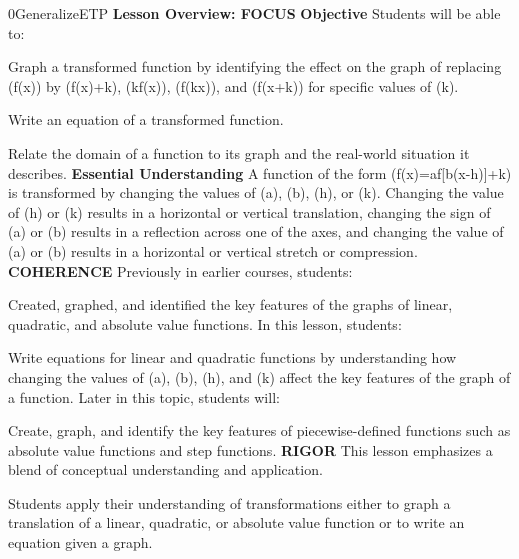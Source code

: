 \documentclass{article}
\newenvironment{te-addendum}[2]{}{}     %
\begin{document}
\begin{te-addendum}{0}{GeneralizeETP}
\textbf{Lesson Overview: FOCUS}
\textbf{Objective} Students will be able to:
\item Graph a transformed function by identifying the effect on the graph of replacing (f(x)) by (f(x)+k), (kf(x)), (f(kx)), and (f(x+k)) for specific values of (k).
\item Write an equation of a transformed function.
\item Relate the domain of a function to its graph and the real-world situation it describes.
\textbf{Essential Understanding}
A function of the form (f(x)=a\cdot f[b(x-h)]+k) is transformed by changing the values of (a), (b), (h), or (k). Changing the value of (h) or (k) results in a horizontal or vertical translation, changing the sign of (a) or (b) results in a reflection across one of the axes, and changing the value of (a) or (b) results in a horizontal or vertical stretch or compression.
\textbf{COHERENCE}
Previously in earlier courses, students:
\item Created, graphed, and identified the key features of the graphs of linear, quadratic, and absolute value functions.
In this lesson, students:
\item Write equations for linear and quadratic functions by understanding how changing the values of (a), (b), (h), and (k) affect the key features of the graph of a function.
Later in this topic, students will:
\item Create, graph, and identify the key features of piecewise-defined functions such as absolute value functions and step functions.
\textbf{RIGOR}
This lesson emphasizes a blend of conceptual understanding and application.
\item Students apply their understanding of transformations either to graph a translation of a linear, quadratic, or absolute value function or to write an equation given a graph.
\end{te-addendum}
\end{document}
